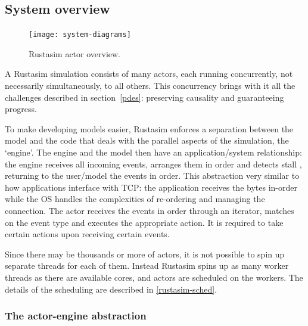 \subsection{System overview} \label{rustasim-overview}

\begin{figure}[h]
\centering
\label{rustasim-overview:fig}
\texttt{[image: system-diagrams]}
\caption{Rustasim actor overview. }
\end{figure}

A Rustasim simulation consists of many actors, each running concurrently, not necessarily simultaneously, to all others.
This concurrency brings with it all the challenges described in section\ \ref{pdes}: preserving causality and guaranteeing progress. 

To make developing models easier, Rustasim enforces a separation between the model and the code that deals with the parallel aspects of the simulation, the `engine'.
The engine and the model then have an application/system relationship: the engine receives all incoming events, arranges them in order and detects stall , returning to the user/model the events in order.
This abstraction very similar  to how applications interface with TCP: the application receives the bytes in-order while the OS handles the complexities of re-ordering and managing the connection.
The actor receives the events in order through an iterator, matches on the event type and executes the appropriate action.
It  is required to take certain actions upon receiving certain events.

Since there may be thousands or more of actors,  it is not possible to spin up separate threads for each of them.
Instead Rustasim spins up as many worker threads as there are available cores, and actors are scheduled on the workers.
The details of the scheduling are described in \ref{rustasim-sched}.



\subsubsection{The actor-engine abstraction} \label{rustasim-actor-engine}

